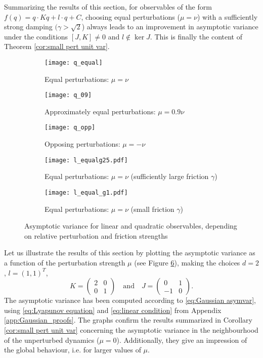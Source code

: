 Summarizing the results of this section, for observables of the form
$f(q)=q\cdot Kq+l\cdot q+C$, choosing equal perturbations ($\mu=\nu$)
with a sufficiently strong damping $(\gamma>\sqrt{2}$) always leads
to an improvement in asymptotic variance under the conditions $[J,K]\neq0$
and $l\notin\ker J$. This is finally the content of Theorem \ref{cor:small pert unit var}.
\begin{figure}
	\begin{subfigure}[b]{0.5 \textwidth}
		\texttt{[image: q\_equal]}
		\caption{Equal perturbations: $\mu=\nu$}
		\label{fig:asym_quad}
	\end{subfigure}
	\hfill
	\begin{subfigure}[b]{0.5 \textwidth}
		\texttt{[image: q\_09]}
		\caption{Approximately equal perturbations: $\mu=0.9\nu$}
		\label{fig:no_limit1}
	\end{subfigure}
	\hfill
	\begin{subfigure}[b]{0.5 \textwidth}
		\texttt{[image: q\_opp]}
		\caption{Opposing perturbations: $\mu=-\nu$ 
			\label{fig:no_limit2}}
	\end{subfigure}
	\hfill
	\begin{subfigure}[b]{0.5 \textwidth}
		\texttt{[image: l\_equalg25.pdf]}
		\caption{Equal perturbations: $\mu=\nu$ (sufficiently large friction $\gamma$)}
		\label{fig:lin_large_friction}
	\end{subfigure}
	\hfill
	\begin{subfigure}[b]{0.5 \textwidth}
		\texttt{[image: l\_equal\_g1.pdf]}
		
		\caption{Equal perturbations: $\mu=\nu$ (small friction $\gamma$)}
		\label{fig:lin_small_friction}
	\end{subfigure}
	\caption{Asymptotic variance for linear and quadratic observables, depending on relative perturbation and friction strengths}
	\label{fig:linear and quadratic observables}
\end{figure}

Let us illustrate the results of this section by plotting the asymptotic variance as a function of the perturbation strength $\mu$ (see Figure \ref{fig:linear and quadratic observables}), making the choices $d=2$, $l=(1,1)^{T}$,
\begin{equation}
K=\left(\begin{array}{cc}
2 & 0\\
0 & 1
\end{array}\right)
\quad \text{and} \quad
J=\left(\begin{array}{cc}
0 & 1\\
-1 & 0
\end{array}\right).
\end{equation}
The asymptotic variance has been computed according to \eqref{eq:Gaussian asymvar}, using \eqref{eq:Lyapunov equation} and \eqref{eq:linear condition} from Appendix \ref{app:Gaussian_proofs}. The graphs confirm the results summarized in Corollary \ref{cor:small pert unit var} concerning the asymptotic variance in the neighbourhood of the unperturbed dynamics ($\mu = 0$). Additionally, they give an impression of the global behaviour, i.e. for larger values of $\mu$.

